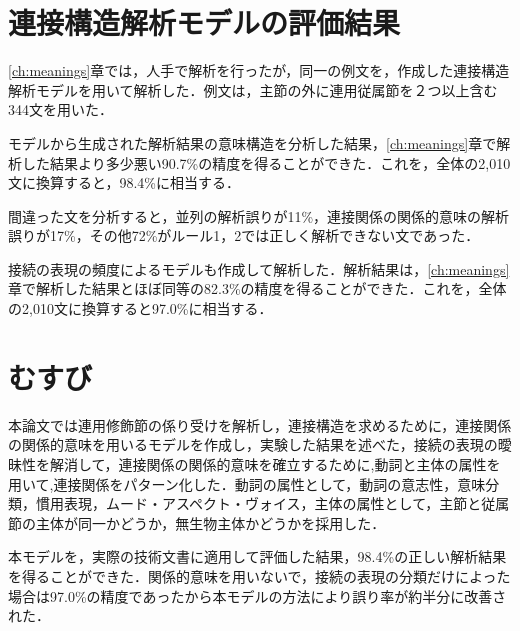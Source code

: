 \section{連接構造解析モデルの評価結果}
\ref{ch:meanings}章では，人手で解析を行ったが，同一の例文を，作成した連接構造解析モデルを用いて解析した．例文は，主節の外に連用従属節を２つ以上含む344文を用いた．

モデルから生成された解析結果の意味構造を分析した結果，\ref{ch:meanings}章で解析した結果より多少悪い90.7\%の精度を得ることができた．これを，全体の2,010文に換算すると，98.4\%に相当する．

間違った文を分析すると，並列の解析誤りが11\%，連接関係の関係的意味の解析誤りが17\%，その他72\%がルール1，2では正しく解析できない文であった．

接続の表現の頻度によるモデルも作成して解析した．解析結果は，\ref{ch:meanings}章で解析した結果とほぼ同等の82.3\%の精度を得ることができた．これを，全体の2,010文に換算すると97.0\%に相当する．

\section{むすび}
本論文では連用修飾節の係り受けを解析し，連接構造を求めるために，連接関係の関係的意味を用いるモデルを作成し，実験した結果を述べた，接続の表現の曖昧性を解消して，連接関係の関係的意味を確立するために,動詞と主体の属性を用いて,連接関係をパターン化した．動詞の属性として，動詞の意志性，意味分類，慣用表現，ムード・アスペクト・ヴォイス，主体の属性として，主節と従属節の主体が同一かどうか，無生物主体かどうかを採用した．

本モデルを，実際の技術文書に適用して評価した結果，98.4\%の正しい解析結果を得ることができた．関係的意味を用いないで，接続の表現の分類だけによった場合は97.0\%の精度であったから本モデルの方法により誤り率が約半分に改善された．





\begin{biography}


\end{biography}


